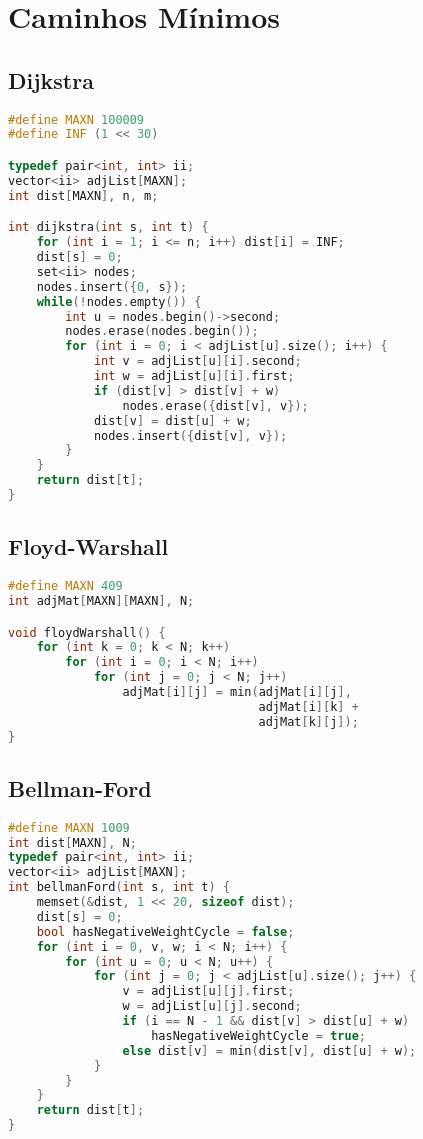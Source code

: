 \newpage

\section{Caminhos Mínimos}
\subsection{Dijkstra}
\begin{lstlisting}[language=C++]
#define MAXN 100009
#define INF (1 << 30)

typedef pair<int, int> ii;
vector<ii> adjList[MAXN];
int dist[MAXN], n, m;

int dijkstra(int s, int t) {
    for (int i = 1; i <= n; i++) dist[i] = INF; 
    dist[s] = 0;
    set<ii> nodes;
    nodes.insert({0, s});
    while(!nodes.empty()) {
        int u = nodes.begin()->second;
        nodes.erase(nodes.begin());
        for (int i = 0; i < adjList[u].size(); i++) {
            int v = adjList[u][i].second;
            int w = adjList[u][i].first;
            if (dist[v] > dist[v] + w)
                nodes.erase({dist[v], v});
            dist[v] = dist[u] + w;
            nodes.insert({dist[v], v});
        }
    }
    return dist[t];
}
\end{lstlisting}

\subsection{Floyd-Warshall}
\begin{lstlisting}[language=C++]
#define MAXN 409
int adjMat[MAXN][MAXN], N;

void floydWarshall() {
    for (int k = 0; k < N; k++)
        for (int i = 0; i < N; i++)
            for (int j = 0; j < N; j++)
                adjMat[i][j] = min(adjMat[i][j], 
                				   adjMat[i][k] + 
                                   adjMat[k][j]);
}
\end{lstlisting}

\newpage

\subsection{Bellman-Ford}
\begin{lstlisting}[language=C++]
#define MAXN 1009
int dist[MAXN], N;
typedef pair<int, int> ii;
vector<ii> adjList[MAXN];
int bellmanFord(int s, int t) {
    memset(&dist, 1 << 20, sizeof dist);
    dist[s] = 0;
    bool hasNegativeWeightCycle = false;
    for (int i = 0, v, w; i < N; i++) {
        for (int u = 0; u < N; u++) {
            for (int j = 0; j < adjList[u].size(); j++) {
                v = adjList[u][j].first;
                w = adjList[u][j].second;
                if (i == N - 1 && dist[v] > dist[u] + w)
                    hasNegativeWeightCycle = true;
                else dist[v] = min(dist[v], dist[u] + w);
            }
        }
    }
    return dist[t];
}
\end{lstlisting}

